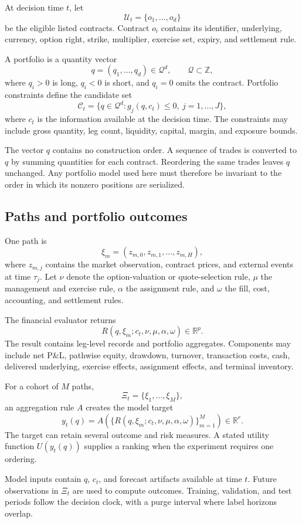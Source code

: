 \documentclass{strategynet-journal}
\newcommand{\R}{\mathbb{R}}
\newcommand{\Z}{\mathbb{Z}}
\begin{document}
At decision time \(t\), let
\[
  \mathcal U_t=\{o_1,\ldots,o_d\}
\]
be the eligible listed contracts.  Contract \(o_i\) contains its identifier,
underlying, currency, option right, strike, multiplier, exercise set, expiry,
and settlement rule.

A portfolio is a quantity vector
\[
  q=(q_1,\ldots,q_d)\in\mathcal Q^d,\qquad \mathcal Q\subset\Z,
\]
where \(q_i>0\) is long, \(q_i<0\) is short, and \(q_i=0\) omits the contract.
Portfolio constraints define the candidate set
\[
  \mathcal C_t
  =\{q\in\mathcal Q^d:g_j(q,c_t)\leq0,\ j=1,\ldots,J\},
\]
where \(c_t\) is the information available at the decision time.  The
constraints may include gross quantity, leg count, liquidity, capital, margin,
and exposure bounds.

The vector \(q\) contains no construction order.  A sequence of trades is
converted to \(q\) by summing quantities for each contract.  Reordering the
same trades leaves \(q\) unchanged.  Any portfolio model used here must
therefore be invariant to the order in which its nonzero positions are
serialized.

\subsection{Paths and portfolio outcomes}

One path is
\[
  \xi_m=(z_{m,0},z_{m,1},\ldots,z_{m,H}),
\]
where \(z_{m,j}\) contains the market observation, contract prices, and
external events at time \(\tau_j\).  Let \(\nu\) denote the option-valuation or
quote-selection rule, \(\mu\) the management and exercise rule, \(\alpha\) the
assignment rule, and \(\omega\) the fill, cost, accounting, and settlement
rules.

The financial evaluator returns
\[
  R(q,\xi_m;c_t,\nu,\mu,\alpha,\omega)\in\R^p.
\]
The result contains leg-level records and portfolio aggregates.  Components
may include net P\&L, pathwise equity, drawdown, turnover, transaction costs,
cash, delivered underlying, exercise effects, assignment effects, and terminal
inventory.

For a cohort of \(M\) paths,
\[
  \Xi_t=\{\xi_1,\ldots,\xi_M\},
\]
an aggregation rule \(A\) creates the model target
\[
  y_t(q)
  =A\left(
    \{R(q,\xi_m;c_t,\nu,\mu,\alpha,\omega)\}_{m=1}^{M}
  \right)\in\R^r.
\]
The target can retain several outcome and risk measures.  A stated utility
function \(U(y_t(q))\) supplies a ranking when the experiment requires one
ordering.

Model inputs contain \(q\), \(c_t\), and forecast artifacts available at time
\(t\).  Future observations in \(\Xi_t\) are used to compute outcomes.
Training, validation, and test periods follow the decision clock, with a purge
interval where label horizons overlap.
\end{document}
